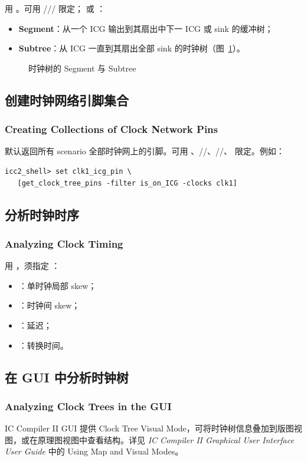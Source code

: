 用 。可用 /// 限定； 或 ：
\begin{itemize}
  \item \textbf{Segment}：从一个 ICG 输出到其扇出中下一 ICG 或 sink 的缓冲树；
  \item \textbf{Subtree}：从 ICG 一直到其扇出全部 sink 的时钟树（图~\ref{fig:seg-sub}）。
\end{itemize}

\begin{figure}[htbp]
\centering
{}
\caption{时钟树的 Segment 与 Subtree}
\label{fig:seg-sub}
\end{figure}

\subsection{创建时钟网络引脚集合}
\subsubsection*{Creating Collections of Clock Network Pins}

 默认返回所有 scenario 全部时钟网上的引脚。可用 、//、//、 限定。例如：
\begin{lstlisting}
icc2_shell> set clk1_icg_pin \
   [get_clock_tree_pins -filter is_on_ICG -clocks clk1]
\end{lstlisting}

\subsection{分析时钟时序}
\subsubsection*{Analyzing Clock Timing}

用 ，须指定 ：
\begin{itemize}
  \item {}：单时钟局部 skew；
  \item {}：时钟间 skew；
  \item {}：延迟；
  \item {}：转换时间。
\end{itemize}

\subsection{在 GUI 中分析时钟树}
\subsubsection*{Analyzing Clock Trees in the GUI}

IC Compiler II GUI 提供 Clock Tree Visual Mode，可将时钟树信息叠加到版图视图，或在原理图视图中查看结构。详见 \textit{IC Compiler II Graphical User Interface User Guide} 中的 Using Map and Visual Modes。
